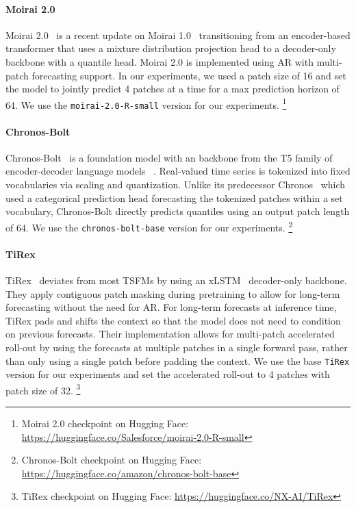 \documentclass{article}
\begin{document}
\paragraph{Moirai 2.0}
Moirai 2.0~\citep{moirai2} is a recent update on Moirai 1.0~\citep{moirai} transitioning from an encoder-based transformer that uses a mixture distribution projection head to a decoder-only backbone with a quantile head. 
Moirai 2.0 is implemented using AR with multi-patch forecasting support. In our experiments, we used a patch size of 16 and set the model to jointly predict 4 patches at a time for a max prediction horizon of 64. 
We use the \texttt{moirai-2.0-R-small} version for our experiments. \footnote{Moirai 2.0 checkpoint on Hugging Face: \url{https://huggingface.co/Salesforce/moirai-2.0-R-small}}

\paragraph{Chronos-Bolt} 
Chronos-Bolt~\citep{chronos-bolt} is a foundation model with an backbone from the T5 family of encoder-decoder language models ~\cite{t5llm}. Real-valued time series is tokenized into fixed vocabularies via scaling and quantization. 
Unlike its predecessor Chronos~\citep{chronos} which used a categorical prediction head forecasting the tokenized patches within a set vocabulary, Chronos-Bolt directly predicts quantiles using an output patch length of 64. 
We use the \texttt{chronos-bolt-base} version for our experiments. \footnote{Chronos-Bolt checkpoint on Hugging Face: \url{https://huggingface.co/amazon/chronos-bolt-base}}

\paragraph{TiRex}
TiRex~\citep{tirex} deviates from most TSFMs by using an xLSTM~\citep{xlstm} decoder-only backbone.
They apply contiguous patch masking during pretraining to allow for long-term forecasting without the need for AR.
For long-term forecasts at inference time, TiRex pads and shifts the context so that the model does not need to condition on previous forecasts.
Their implementation allows for multi-patch accelerated roll-out by using the forecasts at multiple patches in a single forward pass, rather than only using a single patch before padding the context.
We use the base \texttt{TiRex} version for our experiments and set the accelerated roll-out to 4 patches with patch size of 32. \footnote{TiRex checkpoint on Hugging Face: \url{https://huggingface.co/NX-AI/TiRex}}
\end{document}
